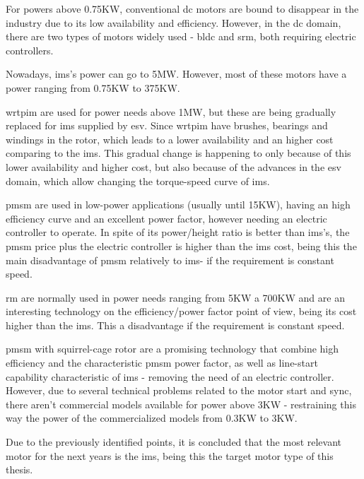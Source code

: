For powers above 0.75KW, conventional \acrshort{dc} motors are bound to disappear in the industry due to its low availability and efficiency. However, in the \acrshort{dc} domain, there are two types of motors widely used - \acrfull{bldc} and \acrfull{srm}, both requiring electric controllers.

Nowadays, \acrshort{ims}'s power can go to 5MW. However, most of these motors have a power ranging from 0.75KW to 375KW. 

\acrshort{wrtpim} are used for power needs above 1MW, but these are being gradually replaced for \acrshort{ims} supplied by \acrfull{esv}. Since \acrshort{wrtpim} have brushes, bearings and windings in the rotor, which leads to a lower availability and an higher cost comparing to the \acrshort{ims}. This gradual change is happening to only because of this lower availability and higher cost, but also because of the advances in the  \acrfull{esv} domain, which allow changing the torque-speed curve of \acrshort{ims}.

\acrshort{pmsm} are used in low-power applications (usually until 15KW), having an high efficiency curve and an excellent power factor, however needing an electric controller to operate. In spite of its power/height ratio is better than \acrshort{ims}'s, the \acrshort{pmsm} price plus the electric controller is higher than the \acrshort{ims} cost, being this the main disadvantage of \acrshort{pmsm} relatively to \acrshort{ims}- if the requirement is constant speed.

\acrshort{rm} are normally used in power needs ranging from 5KW a 700KW and are an interesting technology on the efficiency/power factor point of view, being its cost higher than the \acrshort{ims}. This a disadvantage if the requirement is constant speed.

\acrshort{pmsm} with squirrel-cage rotor are a promising technology that combine high efficiency and the characteristic \acrshort{pmsm} power factor, as well as line-start capability characteristic of \acrshort{ims} - removing the need of an electric controller.
However, due to several technical problems related to the motor start and sync, there aren't commercial models available for power above 3KW - restraining this way the power of the commercialized models from 0.3KW to 3KW.

Due to the previously identified points, it is concluded that the most relevant motor for the next years is the \acrshort{ims}, being this the target motor type of this thesis.

